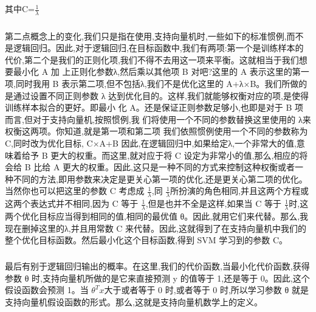 \documentclass{article}
\begin{document}
\begin{CJK}{UTF8}{gbsn}
\begin{equation}
\end{equation}
\subparagraph{}
其中C=$\frac{1}{\lambda}$
\subparagraph{}
第二点概念上的变化,我们只是指在使用,支持向量机时,一些如下的标准惯例,而不是逻辑回归。因此,对于逻辑回归,在目标函数中,我们有两项:第一个是训练样本的代价,第二个是我们的正则化项,我们不得不去用这一项来平衡。这就相当于我们想要最小化 A 加
上正则化参数λ,然后乘以其他项 B 对吧?这里的 A 表示这里的第一项,同时我用 B 表示第二项,但不包括λ,我们不是优化这里的 A+λ×B。我们所做的是通过设置不同正则参数
λ 达到优化目的。这样,我们就能够权衡对应的项,是使得训练样本拟合的更好。即最小
化 A。还是保证正则参数足够小,也即是对于 B 项而言,但对于支持向量机,按照惯例,我
们将使用一个不同的参数替换这里使用的 λ来权衡这两项。你知道,就是第一项和第二项
我们依照惯例使用一个不同的参数称为 C,同时改为优化目标, C×A+B 因此,在逻辑回归中,如果给定λ,一个非常大的值,意味着给予 B 更大的权重。而这里,就对应于将 C 设定为非常小的值,那么,相应的将会给 B 比给 A 更大的权重。因此,这只是一种不同的方式来控制这种权衡或者一种不同的方法,即用参数来决定是更关心第一项的优化,还是更关心第二项的优化。当然你也可以把这里的参数 C 考虑成 $\frac{1}{\lambda}$,同 $\frac{1}{\lambda}$所扮演的角色相同,并且这两个方程或这两个表达式并不相同,因为 C 等于 $\frac{1}{\lambda}$,但是也并不全是这样,如果当 C 等于 $\frac{1}{\lambda}$时,这两个优化目标应当得到相同的值,相同的最优值 θ。因此,就用它们来代替。那么,我现在删掉这里的λ,并且用常数 C 来代替。因此,这就得到了在支持向量机中我们的整个优化目标函数。然后最小化这个目标函数,得到 SVM 学习到的参数 C。
\begin{figure}[H]
\label{fig:702}
\end{figure}
\subparagraph{}
最后有别于逻辑回归输出的概率。在这里,我们的代价函数,当最小化代价函数,获得
参数 θ 时,支持向量机所做的是它来直接预测 y 的值等于 1,还是等于 0。因此,这个假设函数会预测 1。当 $\theta^Tx$大于或者等于 0 时,或者等于 0 时,所以学习参数 θ 就是支持向量机假设函数的形式。那么,这就是支持向量机数学上的定义。
\begin{figure}[H]
\label{fig:705}
\end{figure}

\end{CJK}
\end{document}
